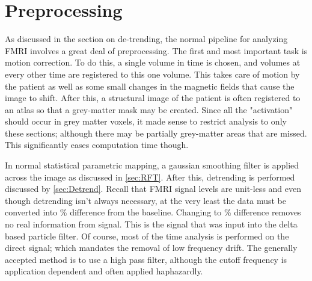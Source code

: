 \section{Preprocessing}
\label{sec:Methods Preprocessing}
As discussed in the section on de-trending, the normal pipeline for analyzing
FMRI involves a great deal of preprocessing. The first and most important
task is motion correction. To do this, a single volume in time is chosen, and
volumes at every other time are registered to this one volume. This takes care
of motion by the patient as well as some small changes in the magnetic
fields that cause the image to shift. After this, a structural image of the
patient is often registered to an atlas so that a grey-matter mask may
be created. Since all the "activation" should occur in grey matter voxels,
it made sense to restrict analysis to only these sections; although
there may be partially grey-matter areas that are missed. This significantly
eases computation time though. 

In normal statistical parametric mapping, a gaussian smoothing
filter is applied across the image as discussed in \autoref{sec:RFT}.
After this, detrending is performed discussed by \autoref{sec:Detrend}.
Recall that FMRI signal levels are unit-less and even though detrending isn't
always necessary, at the very least the data must be converted 
into \% difference from the baseline. Changing to 
\% difference removes no real information
from signal. This is the signal that was input into the delta based 
particle filter. Of course, most of the time analysis is performed on the
direct signal; which mandates the removal of low frequency drift.
The generally accepted method is to use a high pass filter, although the
cutoff frequency is application dependent and often applied haphazardly.

